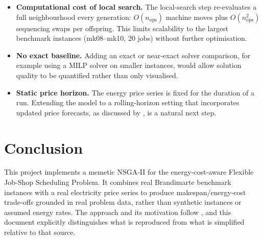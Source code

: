 \documentclass[11pt,a4paper]{article}
\begin{document}
\begin{itemize}
    \item \textbf{Computational cost of local search.} The local-search step re-evaluates a full
    neighbourhood every generation: $O(n_{\text{ops}})$ machine moves plus
    $O(n_{\text{ops}}^2)$ sequencing swaps per offspring. This limits scalability to the largest
    benchmark instances (mk08--mk10, 20 jobs) without further optimisation.
    \item \textbf{No exact baseline.} Adding an exact or near-exact solver comparison, for example
    using a MILP solver on smaller instances, would allow solution quality to be quantified rather
    than only visualised.
    \item \textbf{Static price horizon.} The energy price series is fixed for the duration of a run.
    Extending the model to a rolling-horizon setting that incorporates updated price forecasts, as
    discussed by \citet{burmeister2024memetic}, is a natural next step.
\end{itemize}

\section{Conclusion}
\label{sec:conclusion}

This project implements a memetic NSGA-II for the energy-cost-aware Flexible Job-Shop Scheduling
Problem. It combines real Brandimarte benchmark instances with a real electricity price series to
produce makespan/energy-cost trade-offs grounded in real problem data, rather than synthetic
instances or assumed energy rates. The approach and its motivation follow
\citet{burmeister2024memetic}, and this document explicitly distinguishes what is reproduced from
what is simplified relative to that source.



\end{document}
